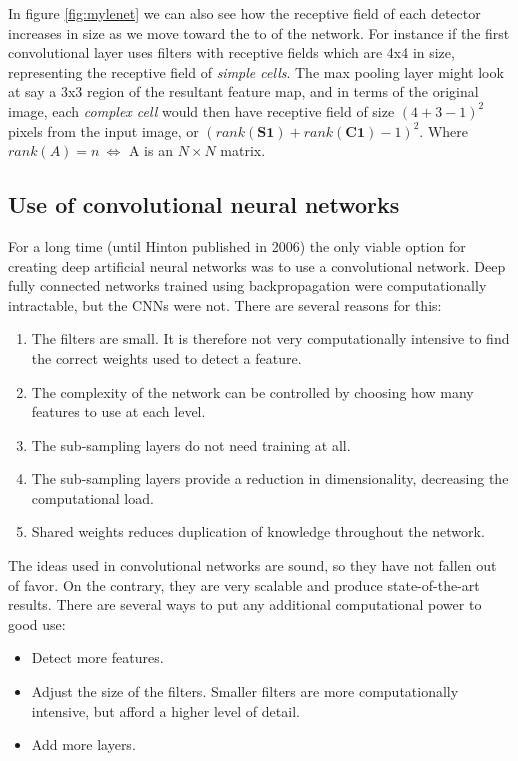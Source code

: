 \documentclass[11pt]{article}
\begin{document}
In figure \ref{fig:mylenet} we can also see how the receptive field of each detector increases in size as we move toward the to of the network.  For instance if the first convolutional layer uses filters with receptive fields which are 4x4 in size, representing the receptive field of \textit{simple cells}.  The max pooling layer might look at say a 3x3 region of the resultant feature map, and in terms of the original image, each \textit{complex cell} would then have receptive field of size $(4 + 3 - 1)^2$ pixels from the input image, or $(rank(\mathbf{S1}) + rank(\mathbf{C1}) - 1)^2$.  Where $rank(A) = n\ \Leftrightarrow$ A is an $N\times N$ matrix.

\subsection{Use of convolutional neural networks}

For a long time (until Hinton published \cite{hinton06} in 2006) the only viable option for creating deep artificial neural networks was to use a convolutional network.  Deep fully connected networks trained using backpropagation were computationally intractable, but the CNNs were not.  There are several reasons for this:

\begin{enumerate}
 \item The filters are small.  It is therefore not very computationally intensive to find the correct weights used to detect a feature.
 \item The complexity of the network can be controlled by choosing how many features to use at each level.
 \item The sub-sampling layers do not need training at all.
 \item The sub-sampling layers provide a reduction in dimensionality, decreasing the computational load.
 \item Shared weights reduces duplication of knowledge throughout the network.
\end{enumerate}

The ideas used in convolutional networks are sound, so they have not fallen out of favor.  On the contrary, they are very scalable and produce state-of-the-art results.  There are several ways to put any additional computational power to good use:
\begin{itemize}
 \item Detect more features.
 \item Adjust the size of the filters.  Smaller filters are more computationally intensive, but afford a higher level of detail.
 \item Add more layers.
\end{itemize}
\end{document}
